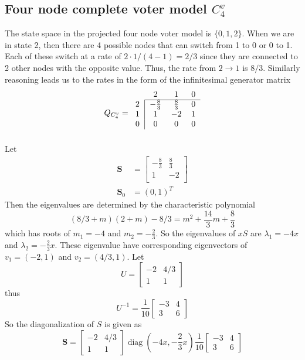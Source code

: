 \subsection{Four node complete voter model \texorpdfstring{$C^{v}_4$}{VC4}}
The state space in the projected four node voter model is $\{0,1,2\}$.
When we are in state 2, then there are 4 possible nodes that can switch from 1 to 0 or 0 to 1.
Each of these switch at a rate of $2 \cdot 1/(4 - 1) = 2/3$ since they are connected to 2 other nodes with the opposite value.
Thus, the rate from $2 \to 1$ is $8/3$.
Similarly reasoning leads us to the rates in the form of the infinitesimal generator matrix
$$
Q_{C^{v}_4} = \begin{blockarray}{cccc}
    & 2 & 1 & 0\\
    \begin{block}{c|ccc}
        \cline{2-4}
        2 & -\frac{8}{3} & \frac{8}{3} & 0 \\
        1 & 1 & -2 & 1\\
        0 & 0 & 0 & 0\\
    \end{block}
\end{blockarray}
$$
Let
\begin{align*}
    \mathbf{S} &= \begin{bmatrix}
    -\frac{8}{3} & \frac{8}{3}\\
    1 & -2\\
    \end{bmatrix}\\
    \mathbf{S}_0 &= (0, 1)^T
\end{align*}
Then the eigenvalues are determined by the characteristic polynomial
$$
(8/3 + m)(2 + m) - 8/3 = m^2 + \frac{14}{3} m + \frac{8}{3}
$$
which has roots of $m_1 = -4$ and $m_2 = - \frac{2}{3}$.
So the eigenvalues of $xS$ are $\lambda_1 = -4x$ and $\lambda_2 =  - \frac{2}{3} x$.
These eigenvalue have corresponding eigenvectors of $v_1 = (-2, 1)$ and $v_2 = (4/3, 1)$.
Let
$$
U = \begin{bmatrix}
    -2 & 4/3\\
    1 & 1
\end{bmatrix}
$$
thus
$$
U^{-1} = \frac{1}{10} \begin{bmatrix}
    -3 & 4\\
    3 & 6
\end{bmatrix}
$$
So the diagonalization of $S$ is given as
$$
\mathbf{S} = \begin{bmatrix}
    -2 & 4/3\\
    1 & 1
\end{bmatrix} \operatorname{diag}(-4x, - \frac{2}{3} x)
\frac{1}{10} \begin{bmatrix}
    -3 & 4\\
    3 & 6
\end{bmatrix}
$$
